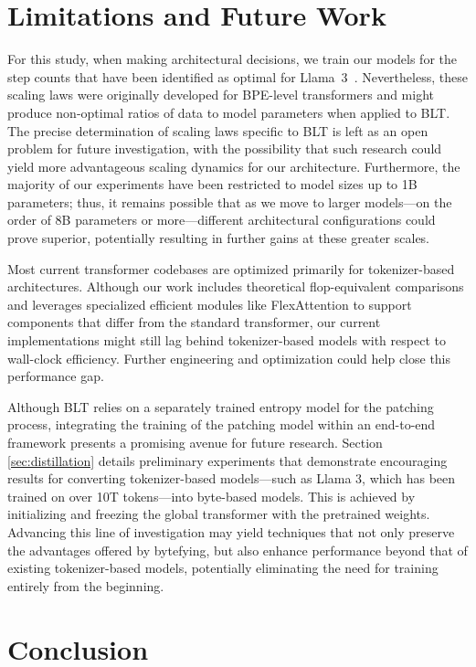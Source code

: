 \section{Limitations and Future Work}

For this study, when making architectural decisions, we train our models for the step counts that have been identified as optimal for Llama~3~\citep{dubey2024llama}. Nevertheless, these scaling laws were originally developed for BPE-level transformers and might produce non-optimal ratios of data to model parameters when applied to {\textsc BLT}. The precise determination of scaling laws specific to {\textsc BLT} is left as an open problem for future investigation, with the possibility that such research could yield more advantageous scaling dynamics for our architecture. Furthermore, the majority of our experiments have been restricted to model sizes up to 1B parameters; thus, it remains possible that as we move to larger models—on the order of 8B parameters or more—different architectural configurations could prove superior, potentially resulting in further gains at these greater scales.

Most current transformer codebases are optimized primarily for tokenizer-based architectures. Although our work includes theoretical flop-equivalent comparisons and leverages specialized efficient modules like FlexAttention to support components that differ from the standard transformer, our current implementations might still lag behind tokenizer-based models with respect to wall-clock efficiency. Further engineering and optimization could help close this performance gap.

Although {\textsc BLT} relies on a separately trained entropy model for the patching process, integrating the training of the patching model within an end-to-end framework presents a promising avenue for future research. Section \ref{sec:distillation} details preliminary experiments that demonstrate encouraging results for converting tokenizer-based models—such as Llama 3, which has been trained on over 10T tokens—into byte-based models. This is achieved by initializing and freezing the global transformer with the pretrained weights. Advancing this line of investigation may yield techniques that not only preserve the advantages offered by bytefying, but also enhance performance beyond that of existing tokenizer-based models, potentially eliminating the need for training entirely from the beginning.

\section{Conclusion}
\label{section:conclusion}

